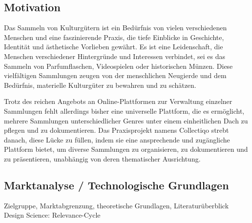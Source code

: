 \subsection{Motivation}\label{subsec:Motivation}
Das Sammeln von Kulturgütern ist ein Bedürfnis von vielen verschiedenen Menschen und eine faszinierende Praxis, die tiefe Einblicke in Geschichte, Identität und ästhetische Vorlieben gewährt.
Es ist eine Leidenschaft, die Menschen verschiedener Hintergründe und Interessen verbindet, sei es das Sammeln von Parfumflaschen, Videospielen oder historischen Münzen.
Diese vielfältigen Sammlungen zeugen von der menschlichen Neugierde und dem Bedürfnis, materielle Kulturgüter zu bewahren und zu schätzen. \par

Trotz des reichen Angebots an Online-Plattformen zur Verwaltung einzelner Sammlungen fehlt allerdings bisher eine universelle Plattform, die es ermöglicht, mehrere Sammlungen unterschiedlicher Genres unter einem einheitlichen Dach zu pflegen und zu dokumentieren.
Das Praxisprojekt namens Collectiqo strebt danach, diese Lücke zu füllen, indem sie eine ansprechende und zugängliche Plattform bietet, um diverse Sammlungen zu organisieren, zu dokumentieren und zu präsentieren, unabhängig von deren thematischer Ausrichtung.


\subsection{Marktanalyse / Technologische Grundlagen}\label{subsec:Marktanalyse-TechnologischeGrundlagen}
Zielgruppe, Marktabgrenzung, theoretische Grundlagen, Literaturüberblick\linebreak
Design Science: Relevance-Cycle